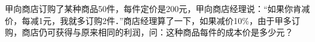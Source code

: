 甲向商店订购了某种商品50件，每件定价是200元，甲向商店经理说：“如果你肯减价，每减1元，我就多订购2件．”商店经理算了一下，如果减价10$\%$，由于甲多订购，商店仍可获得与原来相同的利润，问：这种商品每件的成本价是多少元？



